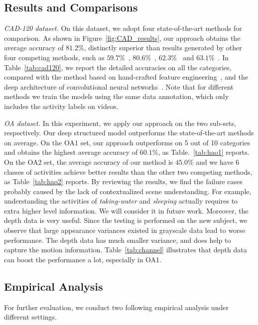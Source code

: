 \documentclass{sig-alternate}
\begin{document}
\subsection{Results and Comparisons}

\emph{CAD-120 dataset.} On this dataset, we adopt four state-of-the-art methods for comparison. As shown in Figure~\ref{fig:CAD_results}, our approach obtains the average accuracy of $81.2\%$, distinctly superior than results generated by other four competing methods, such as $59.7\%$~\cite{SungICRA2012}, $80.6\%$~\cite{CADIJRR2013}, $62.3\%$~\cite{DSTIP} and $63.1\%$~\cite{3DCNNPAMI}. In Table~\ref{tab:cad120}, we report the detailed accuracies on all the categories, compared with the method based on hand-crafted feature engineering~\cite{DSTIP}, and the deep architecture of convolutional neural networks~\cite{3DCNNPAMI}. Note that for different methods we train the models using the same data annotation, which only includes the activity labels on videos.

\emph{OA dataset.} In this experiment, we apply our approach on the two sub-sets, respectively. Our deep structured model outperforms the state-of-the-art methods on average. On the OA1 set, our approach outperforms on 5 out of 10 categories and obtains the highest average accuracy of $60.1\%$, as Table.~\ref{tab:hao1} reports. On the OA2 set, the average accuracy of our method is $45.0\%$ and we have 6 classes of activities achieve better results than the other two competing methods, as Table~\ref{tab:hao2} reports. By reviewing the results, we find the failure cases probably caused by the lack of contextualized scene understanding. For example, understanding the activities of {\em taking-water} and {\em sleeping} actually requires to extra higher level information. We will consider it in future work. Moreover, the depth data is very useful. Since the testing is performed on the new subject, we observe that large appearance variances existed in grayscale data lead to worse performance. The depth data has much smaller variance, and does help to capture the motion information. Table~\ref{tab:channel} illustrates that depth data can boost the performance a lot, especially in OA1. 


\vspace{5mm}
\subsection{Empirical Analysis}

For further evaluation, we conduct two following empirical analysis under different settings.
\end{document}
